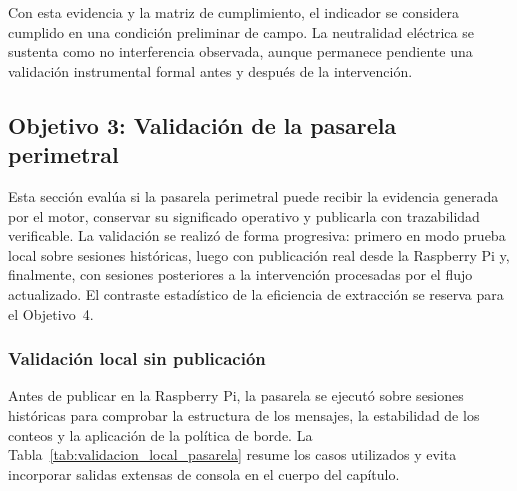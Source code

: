 Con esta evidencia y la matriz de cumplimiento, el indicador se considera cumplido en una condición preliminar de campo. La neutralidad eléctrica se sustenta como no interferencia observada, aunque permanece pendiente una validación instrumental formal antes y después de la intervención.

\subsection{Objetivo 3: Validación de la pasarela perimetral}
\label{sec:obj3-resultados}

Esta sección evalúa si la pasarela perimetral puede recibir la evidencia generada por el motor, conservar su significado operativo y publicarla con trazabilidad verificable. La validación se realizó de forma progresiva: primero en modo prueba local sobre sesiones históricas, luego con publicación real desde la Raspberry Pi y, finalmente, con sesiones posteriores a la intervención procesadas por el flujo actualizado. El contraste estadístico de la eficiencia de extracción se reserva para el Objetivo~4.


\subsubsection{Validación local sin publicación}

Antes de publicar en la Raspberry Pi, la pasarela se ejecutó sobre sesiones históricas para comprobar la estructura de los mensajes, la estabilidad de los conteos y la aplicación de la política de borde. La Tabla~\ref{tab:validacion_local_pasarela} resume los casos utilizados y evita incorporar salidas extensas de consola en el cuerpo del capítulo.

